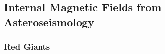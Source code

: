 {\color{red}
\subsection{Internal Magnetic Fields from Asteroseismology}

\subsubsection{Red Giants}





}